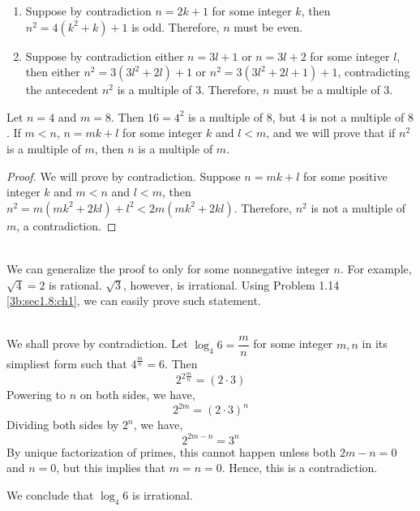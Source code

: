 \begin{pr}\leavevmode
    \begin{enumerate}[label=\textbf{(\alph*)}]
        \item Suppose by contradiction $n = 2k + 1$ for some integer $k$,
        then $n^2 = 4(k^2 + k) + 1$ is odd. Therefore, $n$ must be even.
        \item \label{3b:sec1.8:ch1} Suppose by contradiction either $n = 3l + 1$
        or $n = 3l + 2$ for some integer $l$,
        then either $n^2 = 3(3l^2 + 2l) + 1$ or $n^2 = 3(3l^2 + 2l + 1) + 1$,
        contradicting the antecedent $n^2$ is a multiple of $3$. Therefore,
        $n$ must be a multiple of $3$.
    \end{enumerate}
\end{pr}

\begin{pr}
    Let $n = 4$ and $m = 8$. Then $16 = 4^2$ is a multiple of $8$, but $4$ is not
    a multiple of $8$. If $m < n$, $n = mk + l$ for some integer $k$ and $l < m$, and
    we will prove that if $n^2$ is a multiple of $m$, then $n$ is a multiple of $m$.
    \begin{proof}
        We will prove by contradiction. Suppose $n = mk + l$ for some positive integer $k$
        and $m < n$ and $l < m$, then $n^2 = m(mk^2 + 2kl) + l^2 < 2m(mk^2 + 2kl)$.
        Therefore, $n^2$ is not a multiple of $m$, a contradiction.
    \end{proof}
\end{pr}

\begin{pr}\leavevmode
    \\
    We can generalize the proof to only for some nonnegative integer $n$. For example,
    $\sqrt{4} = 2$ is rational. $\sqrt{3}$, however, is irrational. Using 
    Problem 1.14 \ref{3b:sec1.8:ch1}, we can easily prove such statement.
\end{pr}

\begin{pr}\leavevmode
    \\
    We shall prove by contradiction. Let $\log_4 6 = \dfrac{m}{n}$ for some integer
    $m,n$ in its simpliest form such that $4^{\frac{m}{n}} = 6$. Then
    \begin{equation*}
        2^{2\frac{m}{n}} = (2 \cdot 3)
    \end{equation*}
    Powering to $n$ on both sides, we have,
    \begin{equation*}
        2^{2m} = (2 \cdot 3)^n
    \end{equation*}
    Dividing both sides by $2^n$, we have,
    \begin{equation*}
        2^{2m - n} = 3^n
    \end{equation*}
    By unique factorization of primes, this cannot happen unless both $2m - n = 0$
    and $n = 0$, but this implies that $m = n = 0$. Hence, this is a contradiction.

    We conclude that $\log_4 6$ is irrational.
\end{pr}

